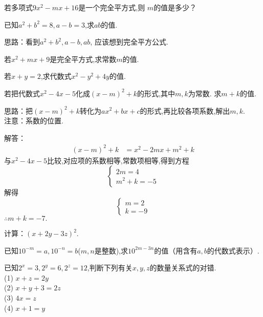 \item{
    若多项式$ 9x^2 - mx+16$是一个完全平方式,则 $m$的值是多少？
}
\item{
    已知$a^2+b^2=8, a-b=3$,求$ab$的值.

    \fangsong{}
    思路：看到$a^2+b^2, a-b, ab$, 应该想到完全平方公式.
}
\item{
    若$x^2+mx+9$是完全平方式,求常数$m$的值.
}
\item{
    若$x+y=2$,求代数式$x^2-y^2+4y$的值.
}
\item{
    若把代数式$x^2-4x-5$化成$(x-m)^2+k$的形式,其中$m,k$为常数. 求$m+k$的值.

    \fangsong{}
    思路：把$(x-m)^2+k$转化为$ax^2+bx+c$的形式,再比较各项系数,解出$m,k$.\\
    注意：系数的位置.

    解答：
    \begin{align*}
        (x-m)^2+k &= x^2-2mx+m^2+k
    \end{align*}
    与$x^2-4x-5$比较,对应项的系数相等,常数项相等,得到方程
    \[\left\{ 
        \begin{array}{lc}
            2m = 4\\
            m^2+k=-5
        \end{array}
    \right.\]
    解得
    \[\left\{ 
        \begin{array}{lc}
            m = 2\\
            k =-9
        \end{array}
    \right.\]
    $\therefore m+k=-7.$
}
\item{
    计算：$(x+2y-3z)^2$.
}
\item{
    已知$10^{-m}=a, 10^{-n}=b$($m, n$是整数),求$10^{2m-3n}$的值（用含有$a, b$的代数式表示）.
}
\item{
    已知$2^x=3, 2^y=6, 2^z=12$,判断下列有关$x, y, z$的数量关系式的对错.\\
    (1) $x+z=2y$\\
    (2) $x+y+3=2z$\\
    (3) $4x=z$\\
    (4) $x+1=y$
}
